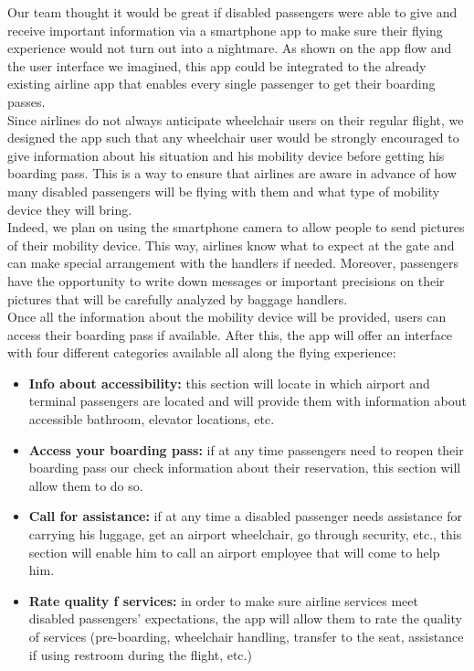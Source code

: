 \newpage

Our team thought it would be great if disabled passengers were able to give and receive important information via a smartphone app to make sure their flying experience would not turn out into a nightmare. As shown on the app flow and the user interface we imagined, this app could be integrated to the already existing airline app that enables every single passenger to get their boarding passes.\\

Since airlines do not always anticipate wheelchair users on their regular flight, we designed the app such that any wheelchair user would be strongly encouraged to give information about his situation and his mobility device before getting his boarding pass. This is a way to ensure that airlines are aware in advance of how many disabled passengers will be flying with them and what type of mobility device they will bring.\\

Indeed, we plan on using the smartphone camera to allow people to send pictures of their mobility device. This way, airlines know what to expect at the gate and can make special arrangement with the handlers if needed. Moreover, passengers have the opportunity to write down messages or important precisions on their pictures that will be carefully analyzed by baggage handlers.\\
Once all the information about the mobility device will be provided, users can access their boarding pass if available. After this, the app will offer an interface with four different categories available all along the flying experience:

\begin{itemize}

\item \textbf{Info about accessibility:} this section will locate in which airport and terminal passengers are located and will provide them with information about accessible bathroom, elevator locations, etc.

\item \textbf{Access your boarding pass:} if at any time passengers need to reopen their boarding pass our check information about their reservation, this section will allow them to do so.

\item \textbf{Call for assistance:} if at any time a disabled passenger needs assistance for carrying his luggage, get an airport wheelchair, go through security, etc., this section will enable him to call an airport employee that will come to help him.

\item \textbf{Rate quality f services:} in order to make sure airline services meet disabled passengers’ expectations, the app will allow them to rate the quality of services (pre-boarding, wheelchair handling, transfer to the seat, assistance if using restroom during the flight, etc.)


\end{itemize}
